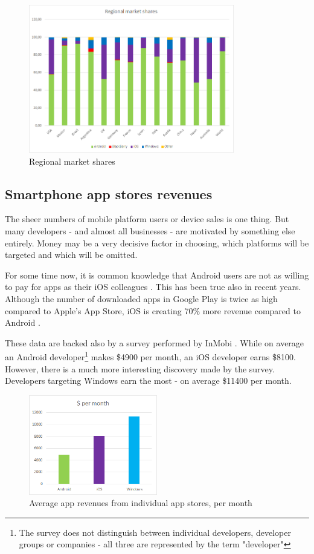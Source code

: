 \documentclass[english,master,public,dept460,male,cpdeclaration,oneside]{diploma}
\begin{document}
\begin{figure}
	\centering\includegraphics[width=0.8\textwidth]{Figures/regionalMarketShares.png}
	\caption{Regional market shares \cite{kantarOSSales}}
\end{figure}

\subsection{Smartphone app stores revenues}
The sheer numbers of mobile platform users or device sales is one thing. But many developers - and almost all businesses - are motivated by something else entirely. Money may be a very decisive factor in choosing, which platforms will be targeted and which will be omitted. 

For some time now, it is common knowledge that Android users are not as willing to pay for apps as their iOS colleagues \cite{iosUsersPay}. This has been true also in recent years. Although the number of downloaded apps in Google Play is twice as high compared to Apple’s App Store, iOS is creating 70\% more revenue compared to Android \cite{iosAndroidStore}. 

These data are backed also by a survey performed by InMobi \cite{lifehackerRevenues}. While on average an Android developer\footnote{The survey does not distinguish between individual developers, developer groups or companies - all three are represented by the term "developer"} makes \$4900 per month, an iOS developer earns \$8100. However, there is a much more interesting discovery made by the survey. Developers targeting Windows earn the most - on average \$11400 per month.

\begin{figure}
	\centering\includegraphics[width=0.5\textwidth]{Figures/appRevenues.png}
	\caption{Average app revenues from individual app stores, per month}
\end{figure}
\end{document}

